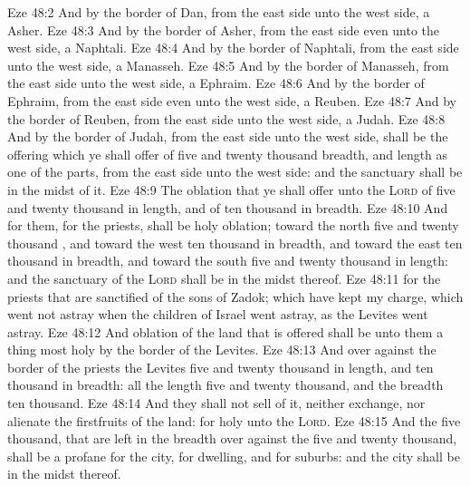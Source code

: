 \vs Eze 48:2 And by the border of Dan, from the east side unto the west side, a  Asher.
\vs Eze 48:3 And by the border of Asher, from the east side even unto the west side, a  Naphtali.
\vs Eze 48:4 And by the border of Naphtali, from the east side unto the west side, a  Manasseh.
\vs Eze 48:5 And by the border of Manasseh, from the east side unto the west side, a  Ephraim.
\vs Eze 48:6 And by the border of Ephraim, from the east side even unto the west side, a  Reuben.
\vs Eze 48:7 And by the border of Reuben, from the east side unto the west side, a  Judah.
\vs Eze 48:8 And by the border of Judah, from the east side unto the west side, shall be the offering which ye shall offer of five and twenty thousand  breadth, and  length as one of the  parts, from the east side unto the west side: and the sanctuary shall be in the midst of it.
\vs Eze 48:9 The oblation that ye shall offer unto the \textsc{Lord}  of five and twenty thousand in length, and of ten thousand in breadth.
\vs Eze 48:10 And for them,  for the priests, shall be  holy oblation; toward the north five and twenty thousand , and toward the west ten thousand in breadth, and toward the east ten thousand in breadth, and toward the south five and twenty thousand in length: and the sanctuary of the \textsc{Lord} shall be in the midst thereof.
\vs Eze 48:11  for the priests that are sanctified of the sons of Zadok; which have kept my charge, which went not astray when the children of Israel went astray, as the Levites went astray.
\vs Eze 48:12 And  oblation of the land that is offered shall be unto them a thing most holy by the border of the Levites.
\vs Eze 48:13 And over against the border of the priests the Levites  five and twenty thousand in length, and ten thousand in breadth: all the length  five and twenty thousand, and the breadth ten thousand.
\vs Eze 48:14 And they shall not sell of it, neither exchange, nor alienate the firstfruits of the land: for  holy unto the \textsc{Lord}.
\vs Eze 48:15 And the five thousand, that are left in the breadth over against the five and twenty thousand, shall be a profane  for the city, for dwelling, and for suburbs: and the city shall be in the midst thereof.

